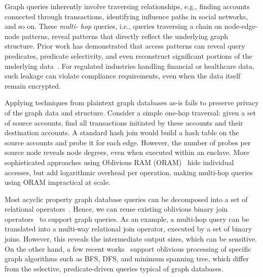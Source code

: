 Graph queries inherently involve traversing 
relationships, e.g., finding accounts connected through transactions, 
identifying influence paths in social networks, and so on. These \textit{multi-
hop} queries, i.e., queries traversing a chain on node-edge-node patterns, 
reveal patterns that directly reflect the underlying graph structure. Prior work has demonstrated that access patterns can reveal query predicates, predicate selectivity, and even reconstruct significant portions of the underlying data~\cite{islam2012access, grubbs2019learning, kellaris2016generic, kornaropoulos2019data, cash2015leakage, demertzis2020seal, grubbs2018pump, gui2019encrypted, lacharite2018improved, oya2021hiding, poddar2020practical, zhang2016all, oya2022ihop, abdelraheem2017inference, dautrich2013compromising, giraud2017practical, grubbs2016breaking, kornaropoulos2022leakage, kornaropoulos2020state, kornaropoulos2021response, liu2014search, markatou2019full, pouliot2016shadow}. For regulated industries handling financial or healthcare data, such leakage can violate compliance requirements, even when the data itself remain encrypted.



Applying techniques from plaintext graph databases as-is fails to preserve
privacy of the graph data and structure. Consider a simple one-hop traversal: 
given a set of source accounts, find all transactions initiated by these 
accounts and their destination accounts. A standard hash join would build a hash 
table on the source accounts and probe it for each edge. However, the number of 
probes per source node reveals node degrees, even when executed within an
enclave. More sophisticated approaches using Oblivious RAM 
(ORAM)~\cite{goldreich1987towards, stefanov2013path} hide individual accesses, 
but add logarithmic overhead per operation, making multi-hop queries using ORAM
impractical at scale. 


Most acyclic property graph database queries can be decomposed into a set of 
relational operators~\cite{yang2025Graphiti}. Hence, we can reuse existing 
oblivious binary join operators~\cite{krastnikov2020efficient,
zheng2017opaque,eskandarian2019oblidb,arasu2013oblivious,mavrogiannakis2025obliviator,reichert2024menhir} to support graph queries. As an example, a multi-hop query 
can be translated into a multi-way relational join operator, executed by a set of 
binary joins. However, this reveals the intermediate output sizes, which can be 
sensitive. On the other hand, a few recent works~\cite{chamani2023graphos, feng2025enabling} support oblivious processing of specific graph algorithms such as 
BFS, DFS, and minimum spanning tree, which differ from the selective, predicate-driven queries typical of graph databases. 

